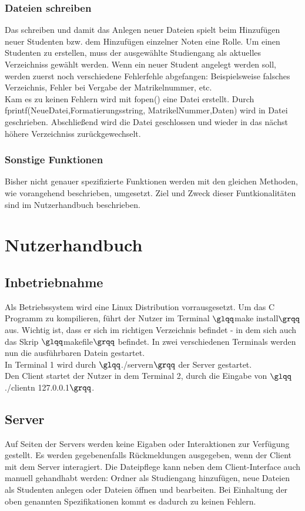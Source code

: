 \documentclass{scrartcl}
\begin{document}
		\subsubsection{Dateien schreiben}	
			Das schreiben und damit das Anlegen neuer Dateien spielt beim Hinzufügen neuer Studenten bzw. dem Hinzufügen einzelner Noten eine Rolle. Um einen Studenten zu erstellen, muss der ausgewählte Studiengang als aktuelles Verzeichniss gewählt werden. Wenn ein neuer Student angelegt werden soll, werden zuerst noch verschiedene Fehlerfehle abgefangen: Beispielsweise falsches Verzeichnis, Fehler bei Vergabe der Matrikelnummer, etc. \\
			Kam es zu keinen Fehlern wird mit fopen() eine Datei erstellt. Durch fprintf(NeueDatei,Formatierungsstring, MatrikelNummer,Daten) wird in Datei geschrieben. Abschließend wird die Datei geschlossen und wieder in das nächst höhere Verzeichniss zurückgewechselt.
		\subsubsection{Sonstige Funktionen}
			Bisher nicht genauer spezifizierte Funktionen werden mit den gleichen Methoden, wie vorangehend beschrieben, umgesetzt. Ziel und Zweck dieser Funtkionalitäten sind im Nutzerhandbuch beschrieben.
\section{Nutzerhandbuch}
	\subsection{Inbetriebnahme}
		Als Betriebssystem wird eine Linux Distribution vorrausgesetzt. Um das C Programm zu kompilieren, führt der Nutzer im Terminal $\glqq$make install$\grqq$ aus. Wichtig ist, dass er sich im richtigen Verzeichnis befindet - in dem sich auch das Skrip $\glqq$makefile$\grqq$ befindet. In zwei verschiedenen Terminals werden nun die ausführbaren Datein gestartet.\\
		In Terminal 1 wird durch $\glqq$./servern$\grqq$ der Server gestartet.\\
		Den Client startet der Nutzer in dem Terminal 2, durch die Eingabe von $\glqq$./clientn 127.0.0.1$\grqq$.
	\subsection{Server}
		Auf Seiten der Servers werden keine Eigaben oder Interaktionen zur Verfügung gestellt. Es werden gegebenenfalls Rückmeldungen ausgegeben, wenn der Client mit dem Server interagiert. Die Dateipflege kann neben dem Client-Interface auch manuell gehandhabt werden: Ordner als Studiengang hinzufügen, neue Dateien als Studenten anlegen oder Dateien öffnen und bearbeiten. Bei Einhaltung der oben genannten Spezifikationen kommt es dadurch zu keinen Fehlern.
\end{document}
